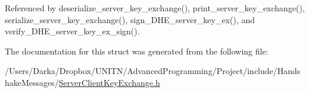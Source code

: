 Referenced by deserialize\+\_\+server\+\_\+key\+\_\+exchange(), print\+\_\+server\+\_\+key\+\_\+exchange(), serialize\+\_\+server\+\_\+key\+\_\+exchange(), sign\+\_\+\+D\+H\+E\+\_\+server\+\_\+key\+\_\+ex(), and verify\+\_\+\+D\+H\+E\+\_\+server\+\_\+key\+\_\+ex\+\_\+sign().



The documentation for this struct was generated from the following file\+:\begin{DoxyCompactItemize}
\item 
/\+Users/\+Darka/\+Dropbox/\+U\+N\+I\+T\+N/\+Advanced\+Programming/\+Project/include/\+Handshake\+Messages/\hyperlink{_server_client_key_exchange_8h}{Server\+Client\+Key\+Exchange.\+h}\end{DoxyCompactItemize}
